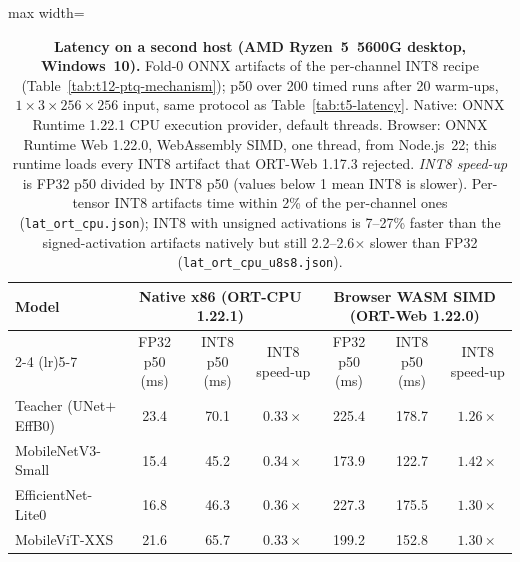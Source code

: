 \begin{table}[ht]
\centering
\caption{\textbf{Latency on a second host (AMD Ryzen~5~5600G desktop, Windows~10).} Fold-0 ONNX artifacts of the per-channel INT8 recipe (Table~\ref{tab:t12-ptq-mechanism}); p50 over 200 timed runs after 20 warm-ups, $1{\times}3{\times}256{\times}256$ input, same protocol as Table~\ref{tab:t5-latency}. Native: ONNX Runtime 1.22.1 CPU execution provider, default threads. Browser: ONNX Runtime Web 1.22.0, WebAssembly SIMD, one thread, from Node.js~22; this runtime loads every INT8 artifact that ORT-Web 1.17.3 rejected. \emph{INT8 speed-up} is FP32 p50 divided by INT8 p50 (values below 1 mean INT8 is slower). Per-tensor INT8 artifacts time within 2\% of the per-channel ones (\texttt{lat\_ort\_cpu.json}); INT8 with unsigned activations is 7--27\% faster than the signed-activation artifacts natively but still 2.2--2.6$\times$ slower than FP32 (\texttt{lat\_ort\_cpu\_u8s8.json}).}
\label{tab:t13-host2}
\small
\setlength{\tabcolsep}{4pt}
\begin{adjustbox}{max width=\textwidth}
\begin{tabular}{lcccccc}
\toprule
\multirow{2}{*}{\textbf{Model}}
  & \multicolumn{3}{c}{\textbf{Native x86 (ORT-CPU 1.22.1)}}
  & \multicolumn{3}{c}{\textbf{Browser WASM SIMD (ORT-Web 1.22.0)}} \\
\cmidrule(lr){2-4} \cmidrule(lr){5-7}
  & FP32 p50 (ms) & INT8 p50 (ms) & INT8 speed-up & FP32 p50 (ms) & INT8 p50 (ms) & INT8 speed-up \\
\midrule
Teacher (UNet$+$EffB0)   & 23.4 & 70.1 & $0.33\times$ & 225.4 & 178.7 & $1.26\times$ \\
MobileNetV3-Small        & 15.4 & 45.2 & $0.34\times$ & 173.9 & 122.7 & $1.42\times$ \\
EfficientNet-Lite0       & 16.8 & 46.3 & $0.36\times$ & 227.3 & 175.5 & $1.30\times$ \\
MobileViT-XXS            & 21.6 & 65.7 & $0.33\times$ & 199.2 & 152.8 & $1.30\times$ \\
\bottomrule
\end{tabular}
\end{adjustbox}
\end{table}
